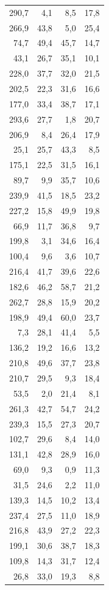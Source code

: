 \documentclass[
  letterpaper,
  DIV=11,
  numbers=noendperiod]{scrreprt}
\begin{document}
\begin{longtable*}{rrrr}
290,7 & 4,1 & 8,5 & 17,8 \\ 
266,9 & 43,8 & 5,0 & 25,4 \\ 
74,7 & 49,4 & 45,7 & 14,7 \\ 
43,1 & 26,7 & 35,1 & 10,1 \\ 
228,0 & 37,7 & 32,0 & 21,5 \\ 
202,5 & 22,3 & 31,6 & 16,6 \\ 
177,0 & 33,4 & 38,7 & 17,1 \\ 
293,6 & 27,7 & 1,8 & 20,7 \\ 
206,9 & 8,4 & 26,4 & 17,9 \\ 
25,1 & 25,7 & 43,3 & 8,5 \\ 
175,1 & 22,5 & 31,5 & 16,1 \\ 
89,7 & 9,9 & 35,7 & 10,6 \\ 
239,9 & 41,5 & 18,5 & 23,2 \\ 
227,2 & 15,8 & 49,9 & 19,8 \\ 
66,9 & 11,7 & 36,8 & 9,7 \\ 
199,8 & 3,1 & 34,6 & 16,4 \\ 
100,4 & 9,6 & 3,6 & 10,7 \\ 
216,4 & 41,7 & 39,6 & 22,6 \\ 
182,6 & 46,2 & 58,7 & 21,2 \\ 
262,7 & 28,8 & 15,9 & 20,2 \\ 
198,9 & 49,4 & 60,0 & 23,7 \\ 
7,3 & 28,1 & 41,4 & 5,5 \\ 
136,2 & 19,2 & 16,6 & 13,2 \\ 
210,8 & 49,6 & 37,7 & 23,8 \\ 
210,7 & 29,5 & 9,3 & 18,4 \\ 
53,5 & 2,0 & 21,4 & 8,1 \\ 
261,3 & 42,7 & 54,7 & 24,2 \\ 
239,3 & 15,5 & 27,3 & 20,7 \\ 
102,7 & 29,6 & 8,4 & 14,0 \\ 
131,1 & 42,8 & 28,9 & 16,0 \\ 
69,0 & 9,3 & 0,9 & 11,3 \\ 
31,5 & 24,6 & 2,2 & 11,0 \\ 
139,3 & 14,5 & 10,2 & 13,4 \\ 
237,4 & 27,5 & 11,0 & 18,9 \\ 
216,8 & 43,9 & 27,2 & 22,3 \\ 
199,1 & 30,6 & 38,7 & 18,3 \\ 
109,8 & 14,3 & 31,7 & 12,4 \\ 
26,8 & 33,0 & 19,3 & 8,8 \\ 

\end{longtable*}
\end{document}
